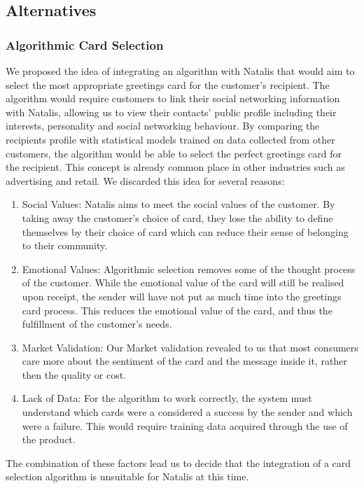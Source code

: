 \subsection*{Alternatives}
\subsubsection*{Algorithmic Card Selection}
We proposed the idea of integrating an algorithm with Natalis that would aim to select the most appropriate greetings card for the customer's recipient. The algorithm would require customers to link their social networking information with Natalis, allowing us to view their contacts' public profile including their interests, personality and social networking behaviour. By comparing the recipients profile with statistical models trained on data collected from other customers, the algorithm would be able to select the perfect greetings card for the recipient. This concept is already common place in other industries such as advertising and retail.
We discarded this idea for several reasons:
\begin{enumerate}
  \item Social Values: Natalis aims to meet the social values of the customer. By taking away the customer's choice of card, they lose the ability to define themselves by their choice of card which can reduce their sense of belonging to their community.
  \item Emotional Values: Algorithmic selection removes some of the thought process of the customer. While the emotional value of the card will still be realised upon receipt, the sender will have not put as much time into the greetings card process. This reduces the emotional value of the card, and thus the fulfillment of the customer's needs.
  \item Market Validation: Our Market validation revealed to us that most consumers care more about the sentiment of the card and the message inside it, rather then the quality or cost.
  \item Lack of Data: For the algorithm to work correctly, the system must understand which cards were a considered a success by the sender and which were a failure. This would require training data acquired through the use of the product.
\end{enumerate}
The combination of these factors lead us to decide that the integration of a card selection algorithm is unsuitable for Natalis at this time.
